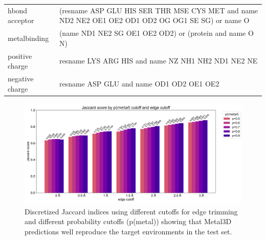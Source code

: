 \documentclass[ lineno,
  9pt]{elife}
\newenvironment{fignos:tagged-figure}[1][]{
  \let\oldthefigure\thefigure
  \let\oldtheHfigure\theHfigure
  \renewcommand{\thefigure}{#1}
  \renewcommand{\theHfigure}{#1}
}{
  \let\thefigure\oldthefigure
  \let\theHfigure\oldtheHfigure
  \addtocounter{figure}{-1}
}
\newenvironment{tablenos:tagged-table}[1][]{
  \let\oldthetable\thetable
  \let\oldtheHtable\theHtable
  \renewcommand{\thetable}{#1}
  \renewcommand{\theHtable}{#1}
}{
  \let\thetable\oldthetable
  \let\theHtable\oldtheHtable
  \addtocounter{table}{-1}
}
\begin{document}
\begin{tablenos:tagged-table}[S2]
\begin{longtable}[]{@{}ll@{}}
\begin{minipage}[t]{0.14\columnwidth}
hbond acceptor\strut
\end{minipage} & \begin{minipage}[t]{0.81\columnwidth}\raggedright
(resname ASP GLU HIS SER THR MSE CYS MET and name ND2 NE2 OE1 OE2 OD1 OD2 OG OG1 SE SG) or name O\strut
\end{minipage}\tabularnewline
\begin{minipage}[t]{0.14\columnwidth}\raggedright
metalbinding\strut
\end{minipage} & \begin{minipage}[t]{0.81\columnwidth}\raggedright
(name ND1 NE2 SG OE1 OE2 OD2) or (protein and name O N)\strut
\end{minipage}\tabularnewline
\begin{minipage}[t]{0.14\columnwidth}\raggedright
positive charge\strut
\end{minipage} & \begin{minipage}[t]{0.81\columnwidth}\raggedright
resname LYS ARG HIS and name NZ NH1 NH2 ND1 NE2 NE\strut
\end{minipage}\tabularnewline
\begin{minipage}[t]{0.14\columnwidth}\raggedright
negative charge\strut
\end{minipage} & \begin{minipage}[t]{0.81\columnwidth}\raggedright
resname ASP GLU and name OD1 OD2 OE1 OE2\strut
\end{minipage}\tabularnewline
\bottomrule
\end{longtable}

\end{tablenos:tagged-table}

\begin{fignos:tagged-figure}[S1]

\begin{figure}
\hypertarget{fig:jaccard}{%
\centering
\includegraphics{images/jaccard_0.5.jpg}
\caption{Discretized Jaccard indices using different cutoffs for edge trimming and different probability cutoffs (p(metal)) showing that Metal3D predictions well reproduce the target environments in the test set.}\label{fig:jaccard}
}
\end{figure}

\end{fignos:tagged-figure}
\end{document}
